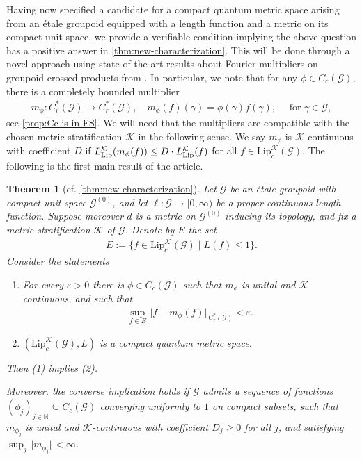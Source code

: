 \documentclass[11pt,a4paper,oneside,final,reqno]{amsart}
\newtheorem{introtheorem}{Theorem}
\theoremstyle{definition}
\newcommand{\G}{\mathcal{G}}
\newcommand{\Go}{\mathcal{G}^{(0)}}
\newcommand{\cK}{\mathcal{K}}
\newcommand{\Lip}{\mathrm{Lip}}
\newcommand{\Cred}{C_{r}^{*}}
\newcommand{\N}{\mathbb{N}}
\numberwithin{equation}{section}
\begin{document}
	Having now specified a candidate for a compact quantum metric space arising from an \'etale groupoid equipped with a length function and a metric on its compact unit space, we provide a verifiable condition 
	implying the
	above question has a positive answer in \cref{thm:new-characterization}. This will be done through a novel approach using 
	state-of-the-art results about Fourier multipliers on groupoid crossed products from \cite{BussKwasniewskiMcKeeSkalski2024}.
	In particular, we note that for any $\phi \in C_c(\G)$, there is a completely bounded multiplier 
	\begin{align*}
		m_\phi \colon \Cred(\G) \to \Cred(\G) , \quad m_\phi(f)(\gamma) = \phi(\gamma) f(\gamma), \quad \text{ for }\gamma\in \G,
	\end{align*}
	see \cref{prop:Cc-is-in-FS}.
	We will 
	need that 
	the multipliers 
	are compatible with the chosen metric stratification $\cK$ in the following sense. We say $m_\phi$ is $\cK$-continuous with coefficient $D$ if $L^\cK_{\rm Lip}(m_\phi (f)) \leq D \cdot L^\cK_{\rm Lip}(f)$  for all $f \in \Lip_c^\cK(\G)$. 
	The following is the first main result of the article. 
	\begin{introtheorem}[cf. \cref{thm:new-characterization}]\label{thm:first-intro-theorem} 
		Let $\G$ be an \'etale groupoid with compact unit space $\Go$, and let $\ell \colon \G \to [0,\infty)$ be a proper continuous length function. 
		Suppose moreover $d$ is a metric on $\Go$ inducing its topology,
		and fix a metric stratification $\cK$ of $\G$. Denote by $E$ the set
		\begin{align*}
			E := \{ f \in \Lip_c^{\cK}(\G) \mid L(f) \leq 1 \}.
		\end{align*}
		Consider the statements
		\begin{enumerate}
			\item 
			For every $\varepsilon > 0$ there is 
			$\phi \in C_c(\G)$ 
			such that $m_\phi$ is unital and $\cK$-continuous, and such that
			\begin{align*}
				\sup_{f\in E} \Vert f - m_{\phi}(f) \Vert_{\Cred(\G)} < \varepsilon.
			\end{align*}
			\item $( \Lip_c^{\cK}(\G), L)$ 
			is a compact quantum metric space.
		\end{enumerate}
		Then (1) implies (2). 
	 
		
		Moreover, the converse implication holds if $\G$ admits a sequence of functions
		$(\phi_j)_{j \in \N} \subseteq C_c(\G)$ converging uniformly to $1$ on compact subsets, 
		such that $m_{\phi_j}$ is unital and $\cK$-continuous with coefficient 
		$D_j \geq 0$ 
		for all $j$, and
		satisfying $\sup_j \Vert m_{\phi_j} \Vert < \infty$. 
	\end{introtheorem}
	
\end{document}
